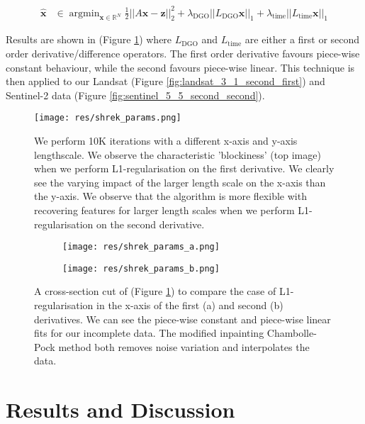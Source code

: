 \documentclass[12pt]{article}
\begin{document}
\begin{align}
  \bm{\hat{x}} &\in \operatorname{argmin}_{\bm{x} \in \mathbb{R}^N}
  \frac{1}{2}{||A\bm{x}-\bm{z}||^2_2} + \lambda_{\text{DGO}} ||L_{\text{DGO}}\bm{x}||_1
   + \lambda_{\text{time}}||L_{\text{time}}\bm{x}||_1
  \label{eqn:minim-data}
\end{align}

Results are shown in (Figure \ref{fig:shrek-params}) where $L_\text{DGO}$ and $L_\text{time}$ are either a first or second order derivative/difference operators. The first order derivative favours piece-wise constant behaviour, while the second favours piece-wise linear. This technique is then applied to our Landsat (Figure \ref{fig:landsat_3_1_second_first}) and Sentinel-2 data (Figure \ref{fig:sentinel_5_5_second_second}).

\begin{figure}[H]
    \centering
    \texttt{[image: res/shrek\_params.png]}
    \caption{We perform 10K iterations with a different x-axis and y-axis lengthscale. We observe the characteristic 'blockiness' (top image) when we perform L1-regularisation on the first derivative. We clearly see the varying impact of the larger length scale on the x-axis than the y-axis. We observe that the algorithm is more flexible with recovering features for larger length scales when we perform L1-regularisation on the second derivative.}
    \label{fig:shrek-params}
\end{figure}

\begin{figure}[H]
    \centering
    \begin{subfigure}[t]{0.45\textwidth}
        \centering
        {\texttt{[image: res/shrek\_params\_a.png]}}
    \end{subfigure}
    \begin{subfigure}[t]{0.45\textwidth}
        \centering
        {\texttt{[image: res/shrek\_params\_b.png]}}
    \end{subfigure}
    \caption{A cross-section cut of (Figure \ref{fig:shrek-params}) to compare the case of L1-regularisation in the x-axis of the first (a) and second (b) derivatives. We can see the piece-wise constant and piece-wise linear fits for our incomplete data. The modified inpainting Chambolle-Pock method both removes noise variation and interpolates the data.}
    \label{fig:shrek-params-cut}
\end{figure}

\section{Results and Discussion}
\end{document}
